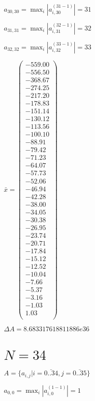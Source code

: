 \documentclass[a4paper,12pt]{article}
\begin{document}
$a _{ 30, 30 } =  \max _i |a _{ i, 30 } ^{ (31 - 1) } | = 31$

$a _{ 31, 31 } =  \max _i |a _{ i, 31 } ^{ (32 - 1) } | = 32$

$a _{ 32, 32 } =  \max _i |a _{ i, 32 } ^{ (33 - 1) } | = 33$

$\bar { x } = \begin{pmatrix}
-559.00 \\
-556.50 \\
-368.67 \\
-274.25 \\
-217.20 \\
-178.83 \\
-151.14 \\
-130.12 \\
-113.56 \\
-100.10 \\
-88.91 \\
-79.42 \\
-71.23 \\
-64.07 \\
-57.73 \\
-52.06 \\
-46.94 \\
-42.28 \\
-38.00 \\
-34.05 \\
-30.38 \\
-26.95 \\
-23.74 \\
-20.71 \\
-17.84 \\
-15.12 \\
-12.52 \\
-10.04 \\
-7.66 \\
-5.37 \\
-3.16 \\
-1.03 \\
1.03 \\
\end{pmatrix}
$

$\Delta A = 8.683317618811886e36$



\section{ $N = 34$ }
$A = \{ a _{ i, j } | i = \bar { 0..34 }, j = \bar { 0..35 } \}$

$a _{ 0, 0 } =  \max _i |a _{ i, 0 } ^{ (1 - 1) } | = 1$
\end{document}
